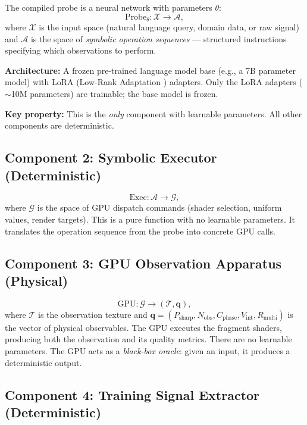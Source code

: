 \documentclass[11pt,twocolumn,a4paper]{article}
\newcommand{\Tex}{\mathcal{T}}
\begin{document}
The compiled probe is a neural network with parameters $\theta$:
\begin{equation}
\text{Probe}_\theta : \mathcal{X} \to \mathcal{A},
\label{eq:probe}
\end{equation}
where $\mathcal{X}$ is the input space (natural language query,
domain data, or raw signal) and $\mathcal{A}$ is the space of
\emph{symbolic operation sequences} --- structured instructions
specifying which observations to perform.

\textbf{Architecture:} A frozen pre-trained language model base
(e.g., a 7B parameter model) with LoRA (Low-Rank Adaptation
\citep{hu2022}) adapters. Only the LoRA adapters ($\sim$10M
parameters) are trainable; the base model is frozen.

\textbf{Key property:} This is the \emph{only} component with
learnable parameters. All other components are deterministic.

\subsection{Component 2: Symbolic Executor (Deterministic)}

\begin{equation}
\text{Exec} : \mathcal{A} \to \mathcal{G},
\label{eq:executor}
\end{equation}
where $\mathcal{G}$ is the space of GPU dispatch commands (shader
selection, uniform values, render targets). This is a pure function
with no learnable parameters. It translates the operation sequence
from the probe into concrete GPU calls.

\subsection{Component 3: GPU Observation Apparatus (Physical)}

\begin{equation}
\text{GPU} : \mathcal{G} \to (\Tex, \bm{q}),
\label{eq:gpu-apparatus}
\end{equation}
where $\Tex$ is the observation texture and $\bm{q} = (P_{\mathrm{sharp}},
N_{\mathrm{obs}}, C_{\mathrm{phase}}, V_{\mathrm{int}},
R_{\mathrm{multi}})$ is the vector of physical observables. The GPU
executes the fragment shaders, producing both the observation and
its quality metrics. There are no learnable parameters. The GPU
acts as a \emph{black-box oracle}: given an input, it produces a
deterministic output.

\subsection{Component 4: Training Signal Extractor (Deterministic)}
\end{document}

